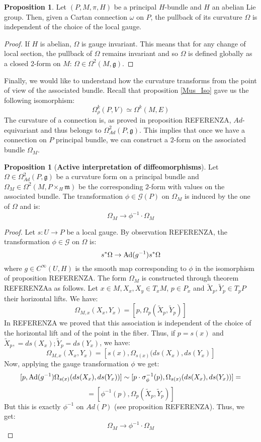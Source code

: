\documentclass[12pt,a4paper]{report}
\theoremstyle{definition}
\theoremstyle{Theorem}
\newtheorem{Prop}[Def]{Proposition}
\theoremstyle{definition}
\theoremstyle{definition}
\begin{document}
	\begin{Prop}
		Let $(P,M,\pi,H)$ be a principal $H$-bundle and $H$ an abelian Lie group. Then, given a Cartan connection $\omega$ on $P$, the pullback of its curvature $\Omega$ is independent of the choice of the local gauge.
	\end{Prop}
	\begin{proof}
		If $H$ is abelian, $\Omega$ is gauge invariant. This means that for any change of local section, the pullback of $\Omega$ remains invariant and so $\Omega$ is defined globally as a closed 2-form on $M$: $\Omega\in \Omega^2(M,\mathfrak{g})$.
	\end{proof}
	Finally, we would like to understand how the curvature transforms from the point of view of the associated bundle. Recall that proposition \ref{Mus_Iso} gave us the following isomorphism:
	$$\Omega^k_\rho(P,V)\simeq \Omega^k(M,E)$$
	The curvature of a connection is, as proved in proposition REFERENZA, $Ad$-equivariant and thus belongs to $\Omega^2_{Ad}(P,\mathfrak{g})$. This implies that once we have a connection on $P$ principal bundle, we can construct a $2$-form on the associated bundle $\Omega_M$.
	\begin{Prop} [\textbf{Active interpretation of diffeomorphisms}]
		Let $\Omega\in \Omega^2_{Ad}(P,\mathfrak{g})$ be a curvature form on a principal bundle and $\Omega_M\in\Omega^2(M,P\times_{H}\mathfrak{m})$ be the corresponding $2$-form with values on the associated bundle. The transformation $\phi\in\mathcal{G}(P)$ on $\Omega_M$ is induced by the one of $\Omega$ and is:
		$$\Omega_M\rightarrow \phi^{-1}\cdot \Omega_M$$
	\end{Prop}
	\begin{proof}
		Let $s:U\rightarrow P$ be a local gauge. By observation REFERENZA, the transformation $\phi\in\mathcal{G}$ on $\Omega$ is:
		$$s^*\Omega\rightarrow \hbox{Ad}(g^{-1})s^*\Omega$$
		where $g\in C^\infty(U,H)$ is the smooth map corresponding to $\phi$ in the isomorphism of proposition REFERENZA. The form $\Omega_M$ is constructed through theorem REFERENZAa as follows. Let $x\in M,X_x,X_y\in T_xM$, $p\in P_x$ and $\tilde{X}_p,\tilde{Y}_p\in T_pP$ their horizontal lifts. We have:
		$$\Omega_{M,x}(X_x,Y_x)=[p,\Omega_p(\tilde{X}_p,\tilde{Y}_p)]$$
		In REFERENZA we proved that this association is independent of the choice of the horizontal lift and of the point in the fiber. Thus, if $p=s(x)$ and $\tilde{X}_p,=ds(X_x);\tilde{Y}_p=ds(Y_x)$, we have:
		$$\Omega_{M,x}(X_x,Y_x)=[s(x),\Omega_{s(x)}(ds(X_x),ds(Y_x)]$$
		Now, applying the gauge transformation $\phi$ we get:
		$$[p,\hbox{Ad}(g^{-1})\Omega_{s(x)}(ds(X_x),ds(Y_x))]\sim [p\cdot \sigma^{-1}_\phi(p),\Omega_{s(x)}(ds(X_x),ds(Y_x))]=$$
		$$=[\phi^{-1}(p),\Omega_p(\tilde{X}_p,\tilde{Y}_p)]$$
		But this is exactly $\phi^{-1}$ on $Ad(P)$ (see proposition REFERENZA). Thus, we get:
		$$\Omega_M\rightarrow \phi^{-1}\cdot \Omega_M$$
	\end{proof}
\end{document}
